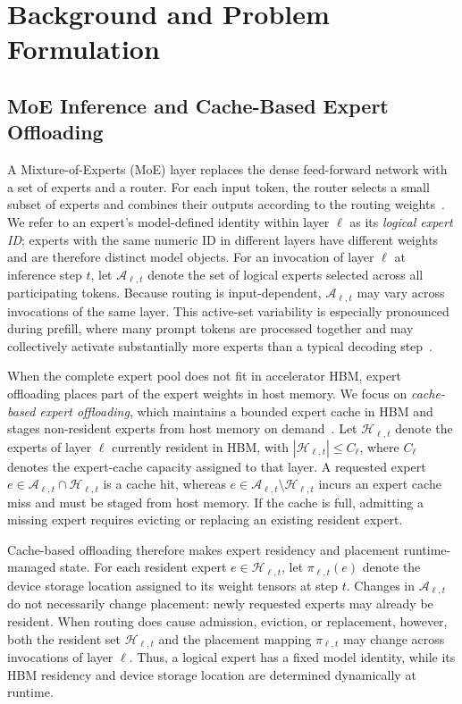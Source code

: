 \section{Background and Problem Formulation}
\label{sec:background}

\subsection{MoE Inference and Cache-Based Expert Offloading}
\label{sec:background_moe}

A Mixture-of-Experts (MoE) layer replaces the dense feed-forward network with a set of experts and a router. 
For each input token, the router selects
a small subset of experts and combines their outputs according to the routing weights~\cite{shazeer2017outrageously,fedus2022switch, jiang2024mixtral,dai2024deepseekmoe}. 
We refer to an expert's model-defined identity within layer $\ell$ as its \emph{logical expert ID}; experts with the same numeric ID in different layers have different weights and are therefore distinct model objects.
For an invocation of layer $\ell$ at inference step $t$, let $\mathcal{A}_{\ell,t}$ denote the set of logical experts selected across all participating tokens.
Because routing is input-dependent, $\mathcal{A}_{\ell,t}$ may vary across invocations of the same layer.
This active-set variability is especially pronounced during prefill, where many prompt tokens are processed together and may collectively activate substantially more experts than a typical decoding step~\cite{fang2025klotski}.

When the complete expert pool does not fit in accelerator HBM, expert offloading places part of the expert weights in host memory. 
We focus on \emph{cache-based expert offloading}, which maintains a bounded expert cache in HBM and stages non-resident experts from host memory on demand~\cite{xue2024moeinfinity,hwang2024pregated,cao2025moelightning,fang2025klotski}.
Let $\mathcal{H}_{\ell,t}$ denote the experts of layer $\ell$ currently resident in HBM, with $|\mathcal{H}_{\ell,t}| \leq C_\ell$, where $C_\ell$ denotes the expert-cache capacity assigned to that layer.
A requested expert $e \in \mathcal{A}_{\ell,t} \cap \mathcal{H}_{\ell,t}$ is a cache hit, whereas $e \in \mathcal{A}_{\ell,t} \setminus \mathcal{H}_{\ell,t}$ incurs an expert cache miss and must be staged from host memory.
If the cache is full, admitting a missing expert requires evicting or replacing an existing resident expert.

Cache-based offloading therefore makes expert residency and placement runtime-managed state. 
For each resident expert $e \in \mathcal{H}_{\ell,t}$, let $\pi_{\ell,t}(e)$ denote the device storage location assigned to its weight tensors at step $t$.
Changes in $\mathcal{A}_{\ell,t}$ do not necessarily change placement: newly requested experts may already be resident. When routing does cause admission, eviction, or replacement, however, both the resident set $\mathcal{H}_{\ell,t}$ and the placement mapping $\pi_{\ell,t}$ may change across invocations of layer $\ell$.
Thus, a logical expert has a fixed model identity, while its HBM residency and device storage location are determined dynamically at runtime.

